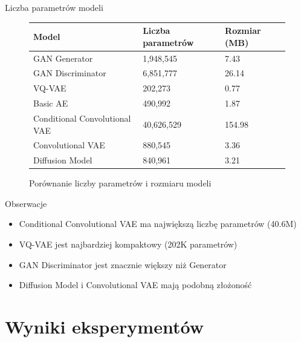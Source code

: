 \documentclass{beamer}
\begin{document}
\begin{frame}{Liczba parametrów modeli}
    \begin{figure}
        \centering
        \begin{tabularx}{\textwidth}{l|Y|Y}
            \hline
            \textbf{Model} & \textbf{Liczba parametrów} & \textbf{Rozmiar (MB)} \\
            \hline
            GAN Generator & 1,948,545 & 7.43 \\
            GAN Discriminator & 6,851,777 & 26.14 \\
            VQ-VAE & 202,273 & 0.77 \\
            Basic AE & 490,992 & 1.87 \\
            Conditional Convolutional VAE & 40,626,529 & 154.98 \\
            Convolutional VAE & 880,545 & 3.36 \\
            Diffusion Model & 840,961 & 3.21 \\
            \hline
        \end{tabularx}
        \caption{Porównanie liczby parametrów i rozmiaru modeli}
    \end{figure}
    \begin{block}{Obserwacje}
        \begin{itemize}
            \item Conditional Convolutional VAE ma największą liczbę parametrów (40.6M)
            \item VQ-VAE jest najbardziej kompaktowy (202K parametrów)
            \item GAN Discriminator jest znacznie większy niż Generator
            \item Diffusion Model i Convolutional VAE mają podobną złożoność
        \end{itemize}
    \end{block}
\end{frame}

\section{Wyniki eksperymentów}
\end{document}
